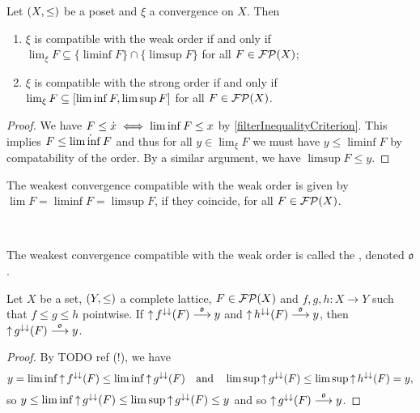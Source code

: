 \begin{lemma}
Let $\left( X,\leq \right)$ be a poset and $\xi$ a convergence on $X$. Then
\begin{enumerate}
\item $\xi$ is compatible with the weak order \textup{if and only if} $\lim_\xi F\subseteq \{\liminf F\}\cap\{\limsup F\}$ for all $F\in\operatorname{\mathcal{FP}}(X)$;
\item $\xi$ is compatible with the strong order \textup{if and only if} $\lim_\xi F\subseteq \interval{\liminf F, \limsup F}$ for all $F\in\operatorname{\mathcal{FP}}(X)$.
\end{enumerate}
\end{lemma}
\begin{proof}
We have $F \leq \dot{x} \iff \liminf F \leq x$ by \ref{filterInequalityCriterion}. This implies 
$F \leq \dot{\liminf F}$ and thus for all $y\in\lim_\xi F$ we must have $y\leq \liminf F$ by compatability of the order. By a similar argument, we have $\limsup F \leq y$.
\end{proof}
\begin{corollary}
The weakest convergence compatible with the weak order is given by $\lim F = \liminf F =\limsup F$, if they coincide, for all $F\in \operatorname{\mathcal{FP}}(X)$.
\end{corollary}\

\begin{definition}
The weakest convergence compatible with the weak order is called the , denoted $\mathfrak{o}$.
\end{definition}

\begin{proposition} \label{squeezeTheorem}
Let $X$ be a set, $\left( Y,\leq \right)$ a complete lattice, $F\in \operatorname{\mathcal{FP}}(X)$ and $f,g,h: X\to Y$ such that $f\leq g\leq h$ pointwise. If $\operatorname{\uparrow} f^{\downarrow\downarrow}(F) \overset{\mathfrak{o}}{\longrightarrow} y$ and $\operatorname{\uparrow} h^{\downarrow\downarrow}(F) \overset{\mathfrak{o}}{\longrightarrow} y$, then $\operatorname{\uparrow} g^{\downarrow\downarrow}(F) \overset{\mathfrak{o}}{\longrightarrow} y$.
\end{proposition}
\begin{proof}
By TODO ref (!), we have
\[ y = \liminf \operatorname{\uparrow} f^{\downarrow\downarrow}(F) \leq \liminf \operatorname{\uparrow} g^{\downarrow\downarrow}(F) \quad\text{and}\quad \limsup \operatorname{\uparrow} g^{\downarrow\downarrow}(F) \leq \limsup \operatorname{\uparrow} h^{\downarrow\downarrow}(F) = y, \]
so $y\leq \liminf \operatorname{\uparrow} g^{\downarrow\downarrow}(F) \leq \limsup \operatorname{\uparrow} g^{\downarrow\downarrow}(F) \leq y$ and so $\operatorname{\uparrow} g^{\downarrow\downarrow}(F) \overset{\mathfrak{o}}{\longrightarrow} y$.
\end{proof}

